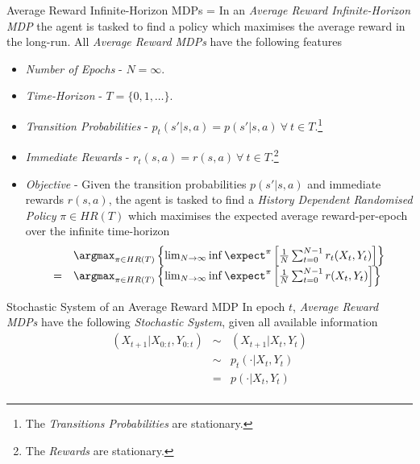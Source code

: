\documentclass[11pt,a4paper]{article}
\begin{document}
  \begin{definition}{Average Reward Infinite-Horizon MDPs}
    \everymath={\displaystyle}
    In an \textit{Average Reward Infinite-Horizon MDP} the agent is tasked to find a policy which maximises the average reward in the long-run. All \textit{Average Reward MDPs} have the following features
    \begin{itemize}
      \item \textit{Number of Epochs} - $N=\infty$.
      \item \textit{Time-Horizon} - $T=\{0,1,\dots\}$.
      \item \textit{Transition Probabilities} - $p_t(s'|s,a)=p(s'|s,a)\ \forall\ t\in T$.\footnote{The \textit{Transitions Probabilities} are stationary.}
      \item \textit{Immediate Rewards} - $r_t(s,a)=r(s,a)\ \forall\ t\in T$.\footnote{The \textit{Rewards} are stationary.}
      \item \textit{Objective} - Given the transition probabilities $p(s'|s,a)$ and immediate rewards $r(s,a)$, the agent is tasked to find a \textit{History Dependent Randomised Policy} $\pi\in HR(T)$ which maximises the expected average reward-per-epoch over the infinite time-horizon
      \[\begin{array}{rl}
        &\argmax_{\pi\in HR(T)}\left\{\lim_{N\to\infty}\inf\expect^\pi\left[\frac1N\sum_{t=0}^{N-1}r_t(X_t,Y_t)\right]\right\}\\
        =&\argmax_{\pi\in HR(T)}\left\{\lim_{N\to\infty}\inf\expect^\pi\left[\frac1N\sum_{t=0}^{N-1}r(X_t,Y_t)\right]\right\}
      \end{array}\]
    \end{itemize}
  \end{definition}

  \begin{proposition}{Stochastic System of an Average Reward MDP}
    In epoch $t$, \textit{Average Reward MDPs} have the following \textit{Stochastic System}, given all available information
    \[\begin{array}{rcl}
      (X_{t+1}|X_{0:t},Y_{0:t})&\sim&(X_{t+1}|X_t,Y_t)\\
      &\sim&p_t(\cdot|X_t,Y_t)\\
      &=&p(\cdot|X_t,Y_t)\\
    \end{array}\]
  \end{proposition}
\end{document}
